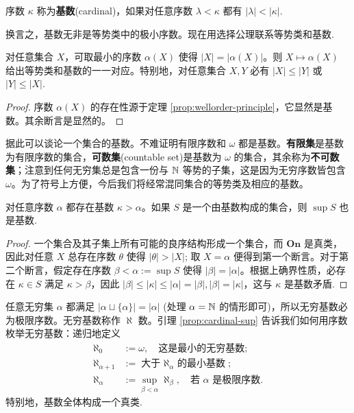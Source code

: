 \begin{definition}
	序数 $\kappa$ 称为\textbf{基数}(cardinal)，如果对任意序数 $\lambda < \kappa$ 都有 $|\lambda| < |\kappa|$.
\end{definition}
换言之，基数无非是等势类中的极小序数。现在用选择公理联系等势类和基数.

\begin{proposition}
	对任意集合 $X$，可取最小的序数 $\alpha(X)$ 使得 $|X|=|\alpha(X)|$。则 $X \mapsto \alpha(X)$ 给出等势类和基数的一一对应。特别地，对任意集合 $X, Y$ 必有 $|X| \leqslant |Y|$ 或 $|Y| \leqslant |X|$.
\end{proposition}
\begin{proof}
  序数 $\alpha(X)$ 的存在性源于定理 \ref{prop:wellorder-principle}，它显然是基数。其余断言是显然的。
\end{proof}

据此可以谈论一个集合的基数。不难证明有限序数和 $\omega$ 都是基数。\textbf{有限集}是基数为有限序数的集合，\textbf{可数集}(countable set)是基数为 $\omega$ 的集合，其余称为\textbf{不可数集}；注意到任何无穷集总是包含一份与 $\mathbb{N}$ 等势的子集，这是因为无穷序数皆包含 $\omega$。为了符号上方便，今后我们将经常混同集合的等势类及相应的基数。

\begin{lemma}\label{prop:cardinal-sup}
	对任意序数 $\alpha$ 都存在基数 $\kappa > \alpha$。如果 $S$ 是一个由基数构成的集合，则 $\sup S$ 也是基数.
\end{lemma}
\begin{proof}
	一个集合及其子集上所有可能的良序结构形成一个集合，而 $\mathbf{On}$ 是真类，因此对任意 $X$ 总存在序数 $\theta$ 使得 $|\theta| > |X|$; 取 $X=\alpha$ 便得到第一个断言。对于第二个断言，假定存在序数 $\beta < \alpha := \sup S$ 使得 $|\beta| = |\alpha|$。根据上确界性质，必存在 $\kappa \in S$ 满足 $\kappa > \beta$，因此 $|\beta| \leqslant |\kappa| \leqslant |\alpha| = |\beta|,|\beta|=|\kappa|$，这与 $\kappa$ 是基数矛盾.
\end{proof}

任意无穷集 $\alpha$ 都满足 $|\alpha \sqcup \{\alpha\}| = |\alpha|$ (处理 $\alpha=\mathbb{N}$ 的情形即可)，所以无穷基数必为极限序数。无穷基数称作 $\aleph$ 数。引理 \ref{prop:cardinal-sup} 告诉我们如何用序数枚举无穷基数：递归地定义
\begin{align*}
	\aleph_0 & := \omega,\quad \text{这是最小的无穷基数}; \\
	\aleph_{\alpha+1} & := \text{大于 $\aleph_\alpha$ 的最小基数}; \\
	\aleph_\alpha & := \sup_{\beta < \alpha} \aleph_\beta,\quad \text{若 $\alpha$ 是极限序数}.
\end{align*}
特别地，基数全体构成一个真类.

